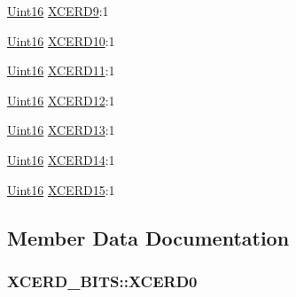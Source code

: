 \begin{DoxyCompactItemize}
\item 
\hyperlink{_d_s_p2833x___device_8h_a59a9f6be4562c327cbfb4f7e8e18f08b}{Uint16} \hyperlink{struct_x_c_e_r_d___b_i_t_s_af497908c7d70cf41f8fd09a2a2b29df3}{X\+C\+E\+R\+D9}\+:1
\item 
\hyperlink{_d_s_p2833x___device_8h_a59a9f6be4562c327cbfb4f7e8e18f08b}{Uint16} \hyperlink{struct_x_c_e_r_d___b_i_t_s_a1621bd7f8813b91550ed333a5df2bf17}{X\+C\+E\+R\+D10}\+:1
\item 
\hyperlink{_d_s_p2833x___device_8h_a59a9f6be4562c327cbfb4f7e8e18f08b}{Uint16} \hyperlink{struct_x_c_e_r_d___b_i_t_s_a772f0696e99026aa920f35e87f8c1dd1}{X\+C\+E\+R\+D11}\+:1
\item 
\hyperlink{_d_s_p2833x___device_8h_a59a9f6be4562c327cbfb4f7e8e18f08b}{Uint16} \hyperlink{struct_x_c_e_r_d___b_i_t_s_ae40d70e6100a29105f32c28ef3c9076b}{X\+C\+E\+R\+D12}\+:1
\item 
\hyperlink{_d_s_p2833x___device_8h_a59a9f6be4562c327cbfb4f7e8e18f08b}{Uint16} \hyperlink{struct_x_c_e_r_d___b_i_t_s_a8be456b72e4396738e0dc05032a07479}{X\+C\+E\+R\+D13}\+:1
\item 
\hyperlink{_d_s_p2833x___device_8h_a59a9f6be4562c327cbfb4f7e8e18f08b}{Uint16} \hyperlink{struct_x_c_e_r_d___b_i_t_s_a70084aa72a8a35a7dcaf096a2b47cba7}{X\+C\+E\+R\+D14}\+:1
\item 
\hyperlink{_d_s_p2833x___device_8h_a59a9f6be4562c327cbfb4f7e8e18f08b}{Uint16} \hyperlink{struct_x_c_e_r_d___b_i_t_s_a8aef7e8812dd5586c792520e8ce00273}{X\+C\+E\+R\+D15}\+:1
\end{DoxyCompactItemize}


\subsection{Member Data Documentation}
\hypertarget{struct_x_c_e_r_d___b_i_t_s_a56634516eb7ed9bf981ba529fe12423f}{}
\subsubsection[{X\+C\+E\+R\+D0}]{ X\+C\+E\+R\+D\+\_\+\+B\+I\+T\+S\+::\+X\+C\+E\+R\+D0}\label{struct_x_c_e_r_d___b_i_t_s_a56634516eb7ed9bf981ba529fe12423f}
\hypertarget{struct_x_c_e_r_d___b_i_t_s_a72286079d3c883e146dbd0c4d0beea05}{}
